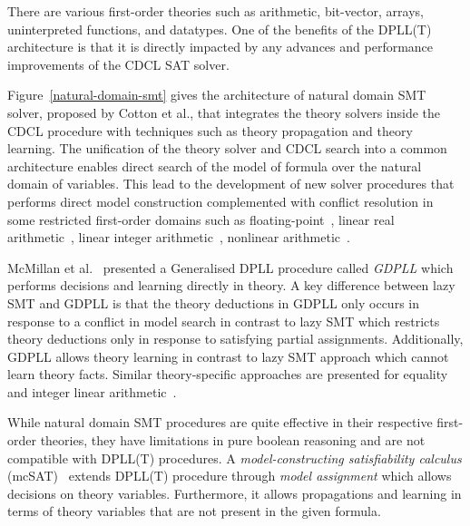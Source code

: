 There are various first-order 
theories such as arithmetic, bit-vector, arrays, uninterpreted functions, and datatypes.  
One of the benefits of the DPLL(T) architecture is that it is directly impacted by any 
advances and performance improvements of the CDCL SAT solver.    


%
Figure~\ref{natural-domain-smt} gives the architecture of natural domain 
SMT solver, proposed by Cotton et al., that integrates the theory solvers 
inside the CDCL procedure with techniques such as theory propagation and theory learning.  
The unification of the theory solver and CDCL search into a common architecture 
enables direct search of the model of formula over the natural domain of variables. 
This lead to the development of new solver procedures that performs direct model 
construction complemented with conflict resolution in some restricted first-order 
domains such as floating-point~\cite{DBLP:journals/fmsd/BrainDGHK14}, linear real
arithmetic~\cite{ndsmt,linear-real}, linear integer arithmetic~\cite{linear-int}, 
nonlinear arithmetic~\cite{nonlinear}.

McMillan et al.~\cite{DBLP:conf/cav/McMillanKS09} presented a Generalised DPLL 
procedure called \emph{GDPLL} which performs decisions and learning directly 
in theory.  A key difference between lazy SMT and GDPLL is that the theory 
deductions in GDPLL only occurs in response to a conflict in model search in contrast 
to lazy SMT which restricts theory deductions only in response to satisfying 
partial assignments.  Additionally, GDPLL allows theory learning in contrast to lazy SMT 
approach which cannot learn theory facts.  Similar theory-specific approaches are presented for 
equality~\cite{DBLP:journals/iandc/BadbanPTZ07} and integer linear 
arithmetic~\cite{DBLP:conf/cade/JovanovicM11}.


While natural domain SMT procedures are quite effective in their respective
first-order theories, they have limitations in pure boolean reasoning and
are not compatible with DPLL(T) procedures.  A \emph{model-constructing 
satisfiability calculus} (mcSAT)~\cite{mcsat1,mcsat2} extends DPLL(T) 
procedure through \emph{model assignment} which allows decisions on theory variables.  
Furthermore, it allows propagations and learning in terms of theory variables 
that are not present in the given formula.

